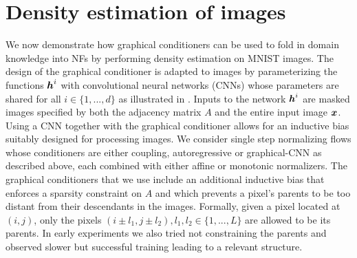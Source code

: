 \section{Density estimation of images} \label{app:MNIST}
We now demonstrate how graphical conditioners can be used to fold in domain knowledge into NFs by performing density estimation on MNIST images. The design of the graphical conditioner is adapted to images by parameterizing the functions $\boldsymbol{h}^i$ with convolutional neural networks (CNNs) whose parameters are shared for all $i \in \{1, ..., d\}$ as illustrated in . Inputs to the network $\boldsymbol{h}^i$ are masked images specified by both the adjacency matrix $A$ and the entire input image $\boldsymbol{x}$. %
Using a CNN together with the graphical conditioner allows for an inductive bias suitably designed for processing images. 
We consider single step normalizing flows whose conditioners are either coupling, autoregressive or graphical-CNN as described above, each combined with either affine or monotonic normalizers. %
The graphical conditioners that we use include an additional inductive bias that enforces a sparsity constraint on $A$ and which prevents a pixel's parents to be too distant from their descendants in the images. Formally, given a pixel located at $(i, j)$, only the pixels $(i \pm l_1, j \pm l_2),  l_1, l_2\in \{1, ..., L\}$ are allowed to be its parents. In early experiments we also tried not constraining the parents and observed slower but successful training leading to a relevant structure. 

